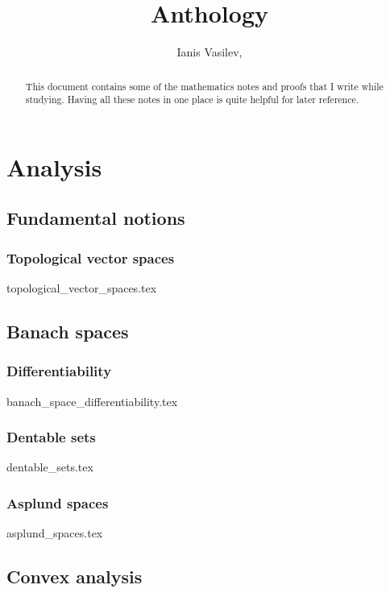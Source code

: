 \documentclass[numbers=endperiod, bibliography=totocnumbered]{scrartcl}
\title{Anthology}
\author{Ianis Vasilev, \Email{ianis@ivasilev.net}}
\date{}
\begin{document}
\maketitle

\begin{abstract}
  This document contains some of the mathematics notes and proofs that I write while studying. Having all these notes in one place is quite helpful for later reference.
\end{abstract}

\tableofcontents

\section{Analysis}\label{sec:analysis}
\subsection{Fundamental notions}\label{sec:analysis/fundamental_notions}
\subsubsection{Topological vector spaces}\label{sec:topological_vector_spaces}
{topological_vector_spaces.tex}

\subsection{Banach spaces}\label{sec:banach_spaces}
\subsubsection{Differentiability}\label{sec:banach_space_differentiability}
{banach_space_differentiability.tex}
\subsubsection{Dentable sets}\label{sec:dentable_sets}
{dentable_sets.tex}
\subsubsection{Asplund spaces}\label{sec:asplund_spaces}
{asplund_spaces.tex}

\subsection{Convex analysis}\label{sec:convex_analysis}
\end{document}
